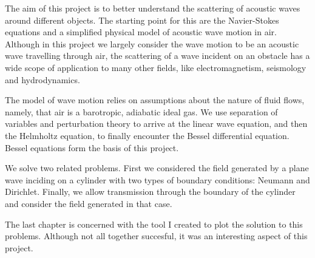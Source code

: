 The aim of this project is to better understand the scattering of acoustic waves around different objects. The starting point for this are the Navier-Stokes equations and a simplified physical model of acoustic wave motion in air. Although in this project we largely consider the wave motion to be an acoustic wave travelling through air, the scattering of a wave incident on an obstacle has a wide scope of application to many other fields, like electromagnetism, seismology and hydrodynamics.


The model of wave motion relies on assumptions about the nature of fluid flows, namely, that air is a barotropic, adiabatic ideal gas. We use separation of variables and perturbation theory to arrive at the linear wave equation, and then the Helmholtz equation, to finally encounter the Bessel differential equation. Bessel equations form the basis of this project.

We solve two related problems. First we considered the field generated by a plane wave inciding on a cylinder with two types of boundary conditions: Neumann and Dirichlet. Finally, we allow transmission through the boundary of the cylinder and consider the field generated in that case.

The last chapter is concerned with the tool I created to plot the solution to this problems. Although not all together succesful, it was an interesting aspect of this project. 
